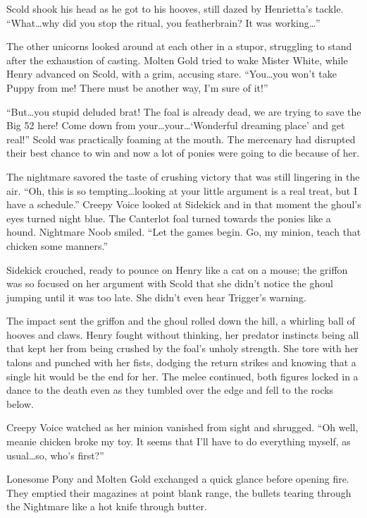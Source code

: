 Scold shook his head as he got to his hooves, still dazed by Henrietta's tackle. ``What\dots why did you stop the ritual, you featherbrain? It was working\dots''

The other unicorns looked around at each other in a stupor, struggling to stand after the exhaustion of casting. Molten Gold tried to wake Mister White, while Henry advanced on Scold, with a grim, accusing stare. ``You\dots you won't take Puppy from me! There must be another way, I'm sure of it!''

``But\dots you stupid deluded brat! The foal is already dead, we are trying to save the Big 52 here! Come down from your\dots your\dots `Wonderful dreaming place' and get real!'' Scold was practically foaming at the mouth. The mercenary had disrupted their best chance to win and now a lot of ponies were going to die because of her.

The nightmare savored the taste of crushing victory that was still lingering in the air. ``Oh, this is so tempting\dots looking at your little argument is a real treat, but I have a schedule.'' Creepy Voice looked at Sidekick and in that moment the ghoul's eyes turned night blue. The Canterlot foal turned towards the ponies like a hound. Nightmare Noob smiled. ``Let the games begin. Go, my minion, teach that chicken some manners.''

Sidekick crouched, ready to pounce on Henry like a cat on a mouse; the griffon was so focused on her argument with Scold that she didn't notice the ghoul jumping until it was too late. She didn't even hear Trigger's warning.

The impact sent the griffon and the ghoul rolled down the hill, a whirling ball of hooves and claws. Henry fought without thinking, her predator instincts being all that kept her from being crushed by the foal's unholy strength. She tore with her talons and punched with her fists, dodging the return strikes and knowing that a single hit would be the end for her. The melee continued, both figures locked in a dance to the death even as they tumbled over the edge and fell to the rocks below.

Creepy Voice watched as her minion vanished from sight and shrugged. ``Oh well, meanie chicken broke my toy. It seems that I'll have to do everything myself, as usual\dots so, who's first?''

Lonesome Pony and Molten Gold exchanged a quick glance before opening fire. They emptied their magazines at point blank range, the bullets tearing through the Nightmare like a hot knife through butter.

